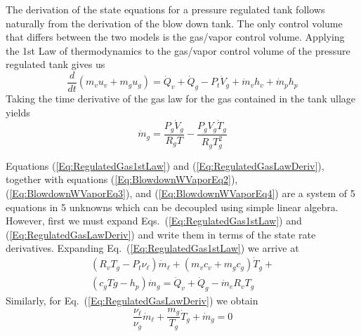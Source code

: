 The derivation of the state equations for a pressure regulated tank
follows naturally from the derivation of the blow down tank.  The
only control volume that differs between the two models is the
gas/vapor control volume.  Applying the 1st Law of thermodynamics to
the gas/vapor control volume of the pressure regulated tank gives us
%
\begin{equation}
   \frac{d}{dt}\left( m_v u_v + m_g u_g \right) = \dot{Q}_v + \dot{Q}_g - P_t \dot{V}_g +
    \dot{m}_v h_v + \dot{m}_p h_p\label{Eq:RegulatedGas1stLaw}
\end{equation}
%
Taking the time derivative of the gas law for the gas contained in
the tank ullage yields
%
\begin{equation}
   \dot{m}_g = \frac{P_g \dot{V}_g}{R_g
   T} - \frac{P_g V_g \dot{T}_g}{R_g T_g^2} \label{Eq:RegulatedGasLawDeriv}
\end{equation}
%

Equations (\ref{Eq:RegulatedGas1stLaw}) and
(\ref{Eq:RegulatedGasLawDeriv}), together with equations
(\ref{Eq:BlowdownWVaporEq2}), (\ref{Eq:BlowdownWVaporEq3}), and
(\ref{Eq:BlowdownWVaporEq4}) are a system of 5 equations in 5
unknowns which can be decoupled using simple linear algebra.
However, first we must expand Eqs.~(\ref{Eq:RegulatedGas1stLaw}) and
(\ref{Eq:RegulatedGasLawDeriv}) and write them in terms of the state
rate derivatives.  Expanding Eq.~(\ref{Eq:RegulatedGas1stLaw}) we
arrive at
\begin{equation}
   \begin{split}
   \left( R_v T_g - P_t \nu_\ell \right)\dot{m}_\ell + \left( m_v c_v + m_g c_g \right)
   \dot{T}_g + \\ \left(c_g Tg - h_p \right)\dot{m}_g = \dot{Q}_v +
   \dot{Q}_g - \dot{m}_e R_v T_g
   \end{split}
\end{equation}
%
Similarly, for Eq.~(\ref{Eq:RegulatedGasLawDeriv}) we obtain
%
\begin{equation}
    \frac{\nu_\ell}{\nu_g}\dot{m}_\ell + \frac{m_g}{T_g}\dot{T}_g + \dot{m}_g = 0
\end{equation}
%

